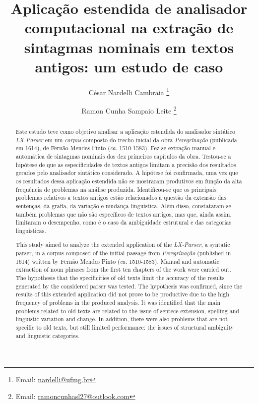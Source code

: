 \documentclass[portuguese]{textolivre}
\title{Aplicação estendida de analisador computacional na extração de sintagmas nominais em textos antigos: um estudo de caso}
\author[1]{César Nardelli Cambraia \orcid{0000-0002-2403-3021} \thanks{Email: \url{nardelli@ufmg.br}}}
\author[1]{Ramon Cunha Sampaio Leite \orcid{0000-0003-0057-4162} \thanks{Email: \url{ramoncunhasl27@outlook.com}}}
\affil[1]{Universidade Federal de Minas Gerais, Faculdade de Letras, Belo Horizonte, MG, Brasil.}
\begin{document}
\maketitle

\begin{polyabstract}
\begin{abstract}
Este estudo teve como objetivo analisar a aplicação estendida do analisador sintático \textit{LX-Parser} em um \textit{corpus} composto do trecho inicial da obra \textit{Peregrinação} (publicada em 1614), de Fernão Mendes Pinto (\textit{ca.} 1510-1583). Fez-se extração manual e automática de sintagmas nominais dos dez primeiros capítulos da obra. Testou-se a hipótese de que as especificidades de textos antigos limitam a precisão dos resultados gerados pelo analisador sintático considerado. A hipótese foi confirmada, uma vez que os resultados dessa aplicação estendida não se mostraram produtivos em função da alta frequência de problemas na análise produzida. Identificou-se que os principais problemas relativos a textos antigos estão relacionados à questão da extensão das sentenças, da grafia, da variação e mudança linguística. Além disso, constataram-se também problemas que não são específicos de textos antigos, mas que, ainda assim, limitaram o desempenho, como é o caso da ambiguidade estrutural e das categorias linguísticas.

\end{abstract}

\begin{english}
\begin{abstract}
This study aimed to analyze the extended application of the \textit{LX-Parser}, a syntatic parser, in a corpus composed of the initial passage from \textit{Peregrinação} (published in 1614) written by Fernão Mendes Pinto (\textit{ca.} 1510-1583). Manual and automatic extraction of noun phrases from the first ten chapters of the work were carried out. The hypothesis that the specificities of old texts limit the accuracy of the results generated by the considered parser was tested. The hypothesis was confirmed, since the results of this extended application did not prove to be productive due to the high frequency of problems in the produced analysis. It was identified that the main problems related to old texts are related to the issue of sentece extension, spelling and linguistic variation and change. In addition, there were also problems that are not specific to old texts, but still limited performance: the issues of structural ambiguity and linguistic categories.

\end{abstract}
\end{english}
\end{polyabstract}
\end{document}
